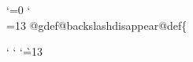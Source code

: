 {{%
%
\def\commondummiesnofonts{%
  \commondummyletter\!%
  \commondummyaccent\"%
  \commondummyaccent\'%
  \commondummyletter\*%
  \commondummyaccent\,%
  \commondummyletter\.%
  \commondummyletter\/%
  \commondummyletter\:%
  \commondummyaccent\=%
  \commondummyletter\?%
  \commondummyaccent\^%
  \commondummyaccent\`%
  \commondummyaccent\~%
  \commondummyword\u
  \commondummyword\v
  \commondummyword\H
  \commondummyword\dotaccent
  \commondummyword\ogonek
  \commondummyword\ringaccent
  \commondummyword\tieaccent
  \commondummyword\ubaraccent
  \commondummyword\udotaccent
  \commondummyword\dotless
  \commondummyword\b
  \commondummyword\i
  \commondummyword\r
  \commondummyword\sansserif
  \commondummyword\sc
  \commondummyword\slanted
  \commondummyword\t
  \commondummyword\abbr
  \commondummyword\acronym
  \commondummyword\anchor
  \commondummyword\cite
  \commondummyword\code
  \commondummyword\command
  \commondummyword\dfn
  \commondummyword\dmn
  \commondummyword\email
  \commondummyword\emph
  \commondummyword\env
  \commondummyword\file
  \commondummyword\image
  \commondummyword\indicateurl
  \commondummyword\inforef
  \commondummyword\kbd
  \commondummyword\key
  \commondummyword\math
  \commondummyword\option
  \commondummyword\pxref
  \commondummyword\ref
  \commondummyword\samp
  \commondummyword\strong
  \commondummyword\tie
  \commondummyword\U
  \commondummyword\uref
  \commondummyword\url
  \commondummyword\var
  \commondummyword\verb
  \commondummyword\w
  \commondummyword\xref
}

\let\indexlbrace\relax
\let\indexrbrace\relax
\let\indexatchar\relax
\let\indexbackslash\relax

{\catcode`\@=0
\catcode`\\=13
  @gdef@backslashdisappear{@def\{}}
}

{
\catcode`
\catcode`
\catcode`\`=13
  \gdef\indexnonalnumdisappear{%
    \ifflagclear{txiindexlquoteignore}{}{%
      \let`=\empty
    }%
    \ifflagclear{txiindexbackslashignore}{}{%
      \backslashdisappear
    }%
    \ifflagclear{txiindexhyphenignore}{}{%
      \def-{}%
    }%
    \ifflagclear{txiindexlessthanignore}{}{%
      \def<{}%
    }%
    \ifflagclear{txiindexatsignignore}{}{%
      \def\@{}%
    }%
  }

}}
